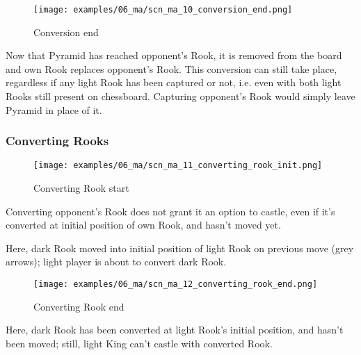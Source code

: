\clearpage %

\noindent
\begin{figure}[!h]
\texttt{[image: examples/06\_ma/scn\_ma\_10\_conversion\_end.png]}
\caption{Conversion end}
\label{fig:scn_ma_10_conversion_end}
\end{figure}

Now that Pyramid has reached opponent's Rook, it is removed from the board and
own Rook replaces opponent's Rook. This conversion can still take place, regardless
if any light Rook has been captured or not, i.e. even with both light Rooks still
present on chessboard. Capturing opponent's Rook would simply leave Pyramid in
place of it.

\clearpage %

\subsubsection*{Converting Rooks}
\label{sec:Mayan Ascendancy/Pyramid/Conversion/Converting Rooks}

\vspace*{-1.1\baselineskip}
\noindent
\begin{figure}[!h]
\texttt{[image: examples/06\_ma/scn\_ma\_11\_converting\_rook\_init.png]}
\caption{Converting Rook start}
\label{fig:scn_ma_11_converting_rook_init}
\end{figure}

Converting opponent's Rook does not grant it an option to castle, even if it's
converted at initial position of own Rook, and hasn't moved yet.

Here, dark Rook moved into initial position of light Rook on previous move
(grey arrows); light player is about to convert dark Rook.

\clearpage %

\noindent
\begin{figure}[!h]
\texttt{[image: examples/06\_ma/scn\_ma\_12\_converting\_rook\_end.png]}
\caption{Converting Rook end}
\label{fig:scn_ma_12_converting_rook_end}
\end{figure}

Here, dark Rook has been converted at light Rook's initial position, and hasn't
been moved; still, light King can't castle with converted Rook.

